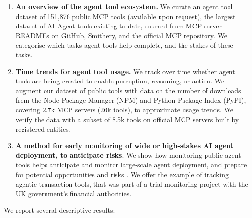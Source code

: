 \documentclass[manuscript,screen,nonacm,oneside]{acmart}
\begin{document}
\begin{enumerate}
\def\labelenumi{\arabic{enumi}.}
\item
 \textbf{An overview of the agent tool ecosystem.} We curate an agent tool dataset of 151,876 public MCP tools (available upon request), the largest dataset of AI Agent tools existing to date, sourced from MCP server READMEs on GitHub, Smithery, and the official MCP repository. We categorise which tasks agent tools help complete, and the stakes of these tasks.
\item
 \textbf{Time trends for agent tool usage.} We track over time whether agent tools are being created to enable perception, reasoning, or action. We augment our dataset of public tools with data on the number of downloads from the Node Package Manager (NPM) and Python Package Index (PyPI), covering 2.7k MCP servers (26k tools), to approximate usage trends. We verify the data with a subset of 8.5k tools on official MCP servers built by registered entities.
\item
 \textbf{A method for early monitoring of wide or high-stakes AI agent deployment, to anticipate risks}. We show how monitoring public agent tools helps anticipate and monitor large-scale agent deployment, and prepare for potential opportunities and risks \citep{stein2024role,bernardi2024societal}. We offer the example of tracking agentic transaction tools, that was part of a trial monitoring project with the UK government's financial authorities.
\end{enumerate}

We report several descriptive results:
\end{document}
